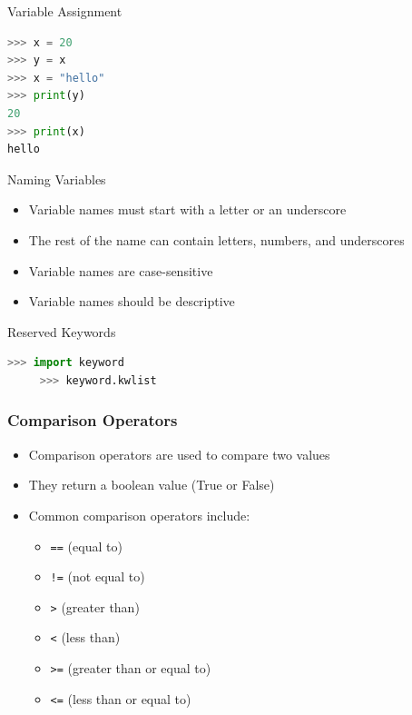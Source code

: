 \begin{frame}[fragile]{Variable Assignment}
    \begin{lstlisting}[style=colorful, language=Python]
>>> x = 20
>>> y = x
>>> x = "hello"
>>> print(y)
20
>>> print(x)
hello
    \end{lstlisting}
\end{frame}


\begin{frame}{Naming Variables}
    \begin{itemize}
        \item Variable names must start with a letter or an underscore
        \item The rest of the name can contain letters, numbers, and underscores
        \item Variable names are case-sensitive
        \item Variable names should be descriptive
    \end{itemize}
\end{frame}

\begin{frame}[fragile]{Reserved Keywords}
    \begin{lstlisting}[style=colorful, language=Python]
     >>> import keyword
     >>> keyword.kwlist      
    \end{lstlisting}
\end{frame} 

\begin{frame}
    \frametitle{Comparison Operators}
    \begin{itemize}
        \item Comparison operators are used to compare two values
        \item They return a boolean value (True or False)
        \item Common comparison operators include:
        \begin{itemize}
            \item \texttt{==} (equal to)
            \item \texttt{!=} (not equal to)
            \item \texttt{>} (greater than)
            \item \texttt{<} (less than)
            \item \texttt{>=} (greater than or equal to)
            \item \texttt{<=} (less than or equal to)
        \end{itemize}
    \end{itemize}
\end{frame}


